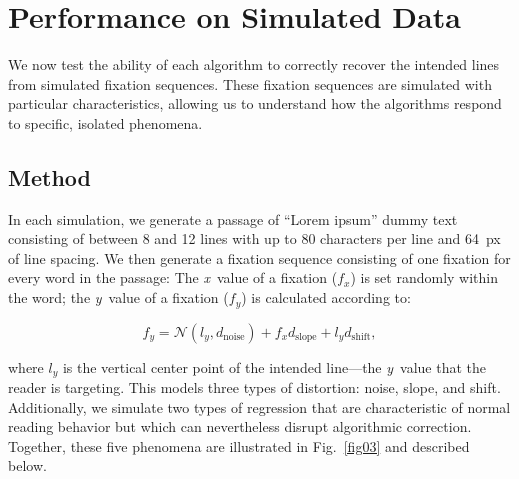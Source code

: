 \documentclass[doc,biblatex]{apa7}
\begin{document}
\section{Performance on Simulated Data}

We now test the ability of each algorithm to correctly recover the intended lines from simulated fixation sequences. These fixation sequences are simulated with particular characteristics, allowing us to understand how the algorithms respond to specific, isolated phenomena.

\subsection{Method}

In each simulation, we generate a passage of ``Lorem ipsum'' dummy text consisting of between 8 and 12 lines with up to 80 characters per line and 64~px of line spacing. We then generate a fixation sequence consisting of one fixation for every word in the passage: The \textit{x}~value of a fixation ($f_x$) is set randomly within the word; the \textit{y}~value of a fixation ($f_y$) is calculated according to:

	\begin{equation}
	f_y = \mathcal{N}(l_y, d_\mathrm{noise}) + f_x d_\mathrm{slope} + l_y d_\mathrm{shift},
	\label{equation2}
	\end{equation}

\noindent where $l_y$ is the vertical center point of the intended line---the \textit{y}~value that the reader is targeting. This models three types of distortion: noise, slope, and shift. Additionally, we simulate two types of regression that are characteristic of normal reading behavior but which can nevertheless disrupt algorithmic correction. Together, these five phenomena are illustrated in Fig.~\ref{fig03} and described below.
\end{document}
